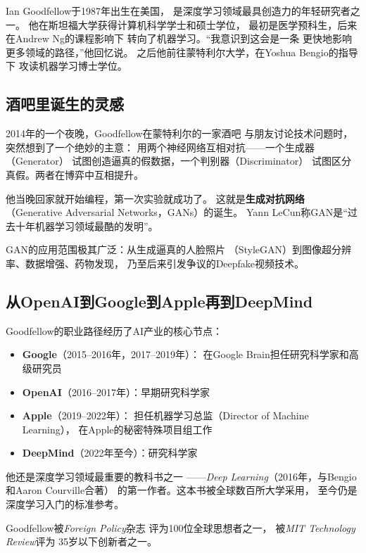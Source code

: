 Ian Goodfellow于1987年出生在美国，
是深度学习领域最具创造力的年轻研究者之一。
他在斯坦福大学获得计算机科学学士和硕士学位，
最初是医学预科生，后来在Andrew Ng的课程影响下
转向了机器学习。``我意识到这会是一条
更快地影响更多领域的路径，''他回忆说。
之后他前往蒙特利尔大学，在Yoshua Bengio的指导下
攻读机器学习博士学位。

\subsection{酒吧里诞生的灵感}

2014年的一个夜晚，Goodfellow在蒙特利尔的一家酒吧
与朋友讨论技术问题时，突然想到了一个绝妙的主意：
用两个神经网络互相对抗——一个生成器（Generator）
试图创造逼真的假数据，一个判别器（Discriminator）
试图区分真假。两者在博弈中互相提升。

他当晚回家就开始编程，第一次实验就成功了。
这就是\textbf{生成对抗网络}
（Generative Adversarial Networks，GANs）的诞生。
Yann LeCun称GAN是``过去十年机器学习领域最酷的发明''。

GAN的应用范围极其广泛：从生成逼真的人脸照片
（StyleGAN）到图像超分辨率、数据增强、药物发现，
乃至后来引发争议的Deepfake视频技术。

\subsection{从OpenAI到Google到Apple再到DeepMind}
Goodfellow的职业路径经历了AI产业的核心节点：
\begin{itemize}[noitemsep]
  \item \textbf{Google}（2015--2016年，2017--2019年）：
    在Google Brain担任研究科学家和高级研究员
  \item \textbf{OpenAI}（2016--2017年）：早期研究科学家
  \item \textbf{Apple}（2019--2022年）：
    担任机器学习总监（Director of Machine Learning），
    在Apple的秘密特殊项目组工作
  \item \textbf{DeepMind}（2022年至今）：研究科学家
\end{itemize}

他还是深度学习领域最重要的教科书之一
——\textit{Deep Learning}（2016年，与Bengio和Aaron Courville合著）
的第一作者。这本书被全球数百所大学采用，
至今仍是深度学习入门的标准参考。

Goodfellow被\textit{Foreign Policy}杂志
评为100位全球思想者之一，
被\textit{MIT Technology Review}评为
35岁以下创新者之一。


